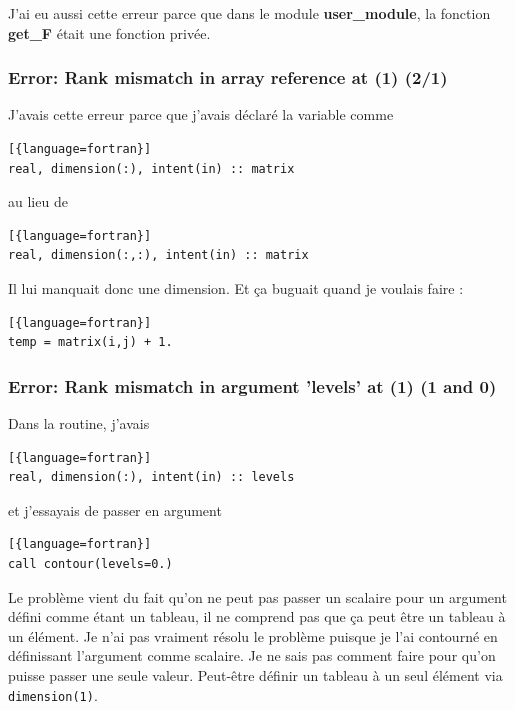 \documentclass[a4paper,twoside]{article}
\begin{document}
\bigskip

J'ai eu aussi cette erreur parce que dans le module \textbf{user\_module}, la fonction \textbf{get\_F} était une fonction privée.

\subsubsection{Error: Rank mismatch in array reference at (1) (2/1)}
J'avais cette erreur parce que j'avais déclaré la variable comme 
\begin{lstlisting}[{language=fortran}]
real, dimension(:), intent(in) :: matrix
\end{lstlisting}
au lieu de
\begin{lstlisting}[{language=fortran}]
real, dimension(:,:), intent(in) :: matrix
\end{lstlisting}
Il lui manquait donc une dimension. Et ça buguait quand je voulais faire :
\begin{lstlisting}[{language=fortran}]
temp = matrix(i,j) + 1.
\end{lstlisting}

\subsubsection{Error: Rank mismatch in argument 'levels' at (1) (1 and 0)}
Dans la routine, j'avais
\begin{lstlisting}[{language=fortran}]
real, dimension(:), intent(in) :: levels
\end{lstlisting}
et j'essayais de passer en argument
\begin{lstlisting}[{language=fortran}]
call contour(levels=0.)
\end{lstlisting}
Le problème vient du fait qu'on ne peut pas passer un scalaire pour un argument défini comme étant un tableau, il ne comprend pas que ça peut être un tableau à un élément. Je n'ai pas vraiment résolu le problème puisque je l'ai contourné en définissant l'argument comme scalaire. Je ne sais pas comment faire pour qu'on puisse passer une seule valeur. Peut-être définir un tableau à un seul élément via \texttt{dimension(1)}.
\end{document}
